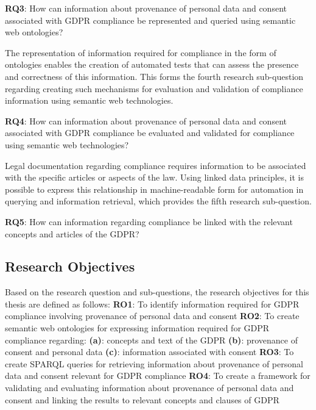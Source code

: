 \begin{framed}
\textbf{RQ3}: How can information about provenance of personal data and consent associated with GDPR compliance be represented and queried using semantic web ontologies?
\end{framed}
The representation of information required for compliance in the form of ontologies enables the creation of automated tests that can assess the presence and correctness of this information. This forms the fourth research sub-question regarding creating such mechanisms for evaluation and validation of compliance information using semantic web technologies.
\begin{framed}
\textbf{RQ4}: How can information about provenance of personal data and consent associated with GDPR compliance be evaluated and validated for compliance using semantic web technologies?
\end{framed}
Legal documentation regarding compliance requires information to be associated with the specific articles or aspects of the law. Using linked data principles, it is possible to express this relationship in machine-readable form for automation in querying and information retrieval, which provides the fifth research sub-question.
\begin{framed}
\textbf{RQ5}: How can information regarding compliance be linked with the relevant concepts and articles of the GDPR?
\end{framed}


\subsection{Research Objectives}\label{sec:intro-RO}
Based on the research question and sub-questions, the research objectives for this thesis are defined as follows:
\newline\noindent\textbf{RO1}: To identify information required for GDPR compliance involving provenance of personal data and consent
\newline\noindent\textbf{RO2}: To create semantic web ontologies for expressing information required for GDPR compliance regarding:
\newline\indent\indent\textbf{(a)}: concepts and text of the GDPR
\newline\indent\indent\textbf{(b)}: provenance of consent and personal data
\newline\indent\indent\textbf{(c)}: information associated with consent
\newline\noindent\textbf{RO3}: To create SPARQL queries for retrieving information about provenance of personal data and consent relevant for GDPR compliance
\newline\noindent\textbf{RO4}: To create a framework for validating and evaluating information about provenance of personal data and consent and linking the results to relevant concepts and clauses of GDPR

